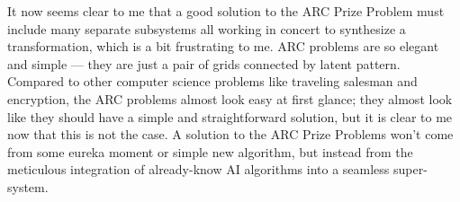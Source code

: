 \documentclass[letterpaper]{article} %
\begin{document}
\bigskip

It now seems clear to me that a good solution to the ARC Prize Problem must include many separate subsystems all working in concert to synthesize a transformation, which is a bit frustrating to me. ARC problems are so elegant and simple --- they are just a pair of grids connected by latent pattern. Compared to other computer science problems like traveling salesman and encryption, the ARC problems almost look easy at first glance; they almost look like they should have a simple and straightforward solution, but it is clear to me now that this is not the case. A solution to the ARC Prize Problems won't come from some eureka moment or simple new algorithm, but instead from the meticulous integration of already-know AI algorithms into a seamless super-system.


\end{document}
